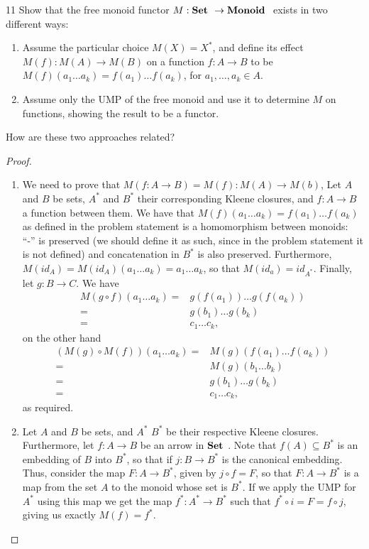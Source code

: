 \begin{exercise}{11}
Show that the free monoid functor $M: {\normalfont\textbf{Set }} \to {\normalfont\textbf{Monoid }}$ exists in two different ways:
\begin{enumerate}
    \item Assume the particular choice $M(X) = X^\ast$, and define its effect $M(f): M(A) \to M(B)$ on a function $f: A \to B$ to be $M(f)(a_1 \dots a_k) = f(a_1) \dots f(a_k)$, for $a_1, \dots, a_k \in A$.
    \item Assume only the UMP of the free monoid and use it to determine $M$ on functions, showing the result to be a functor.
\end{enumerate}

How are these two approaches related?
\end{exercise}
\begin{proof}
\begin{enumerate}
    \item We need to prove that $M(f: A \to B) = M(f): M(A) \to M(b)$,
    Let $A$ and $B$ be sets, $A^\ast$ and $B^\ast$ their corresponding Kleene closures, and $f: A \to B$ a function between them.
    We have that $M(f)(a_1 \dots a_k) = f(a_1) \dots f(a_k)$ as defined in the problem statement is a homomorphism between monoids:
    ``-'' is preserved (we should define it as such, since in the problem statement it is not defined) and concatenation in $B^\ast$ is also preserved.
    Furthermore, $M(id_A) = M(id_A)(a_1 \dots a_k) =a_1 \dots a_k$, so that $M(id_a) = id_{A^\ast}$.
    Finally, let $g: B \to C$.
    We have 
    \begin{align*}
        M(g \circ f)(a_1 \dots a_k) 
        =& g(f(a_1)) \dots g(f(a_k))\\
        =& g(b_1) \dots g(b_k)\\
        =& c_1 \dots c_k,
    \end{align*}
    on the other hand
    \begin{align*}
        (M(g) \circ M(f))(a_1 \dots a_k)
        =& M(g)(f(a_1) \dots f(a_k))\\
        =& M(g)(b_1 \dots b_k)\\
        =& g(b_1) \dots g(b_k)\\
        =& c_1 \dots c_k,
    \end{align*}
    as required.
    \item Let $A$ and $B$ be sets, and $A^\ast$ $B^\ast$ be their respective Kleene closures. 
    Furthermore, let $f: A \to B$ be an arrow in ${\normalfont\textbf{Set }}$.
    Note that $f(A) \subseteq B^\ast$ is an embedding of $B$ into $B^\ast$, so that if $j: B \to B^\ast$ is the canonical embedding.
    Thus, consider the map $F: A \to B^\ast$, given by $j \circ f = F$, so that $F: A \to B^\ast$ is a map from the set $A$ to the monoid whose set is $B^\ast$.
    If we apply the UMP for $A^\ast$ using this map we get the map $f^\ast: A^\ast \to B^\ast$ such that $f^\ast \circ i = F = f \circ j$, giving us exactly $M(f) = f^\ast$.
\end{enumerate}
\end{proof} 
